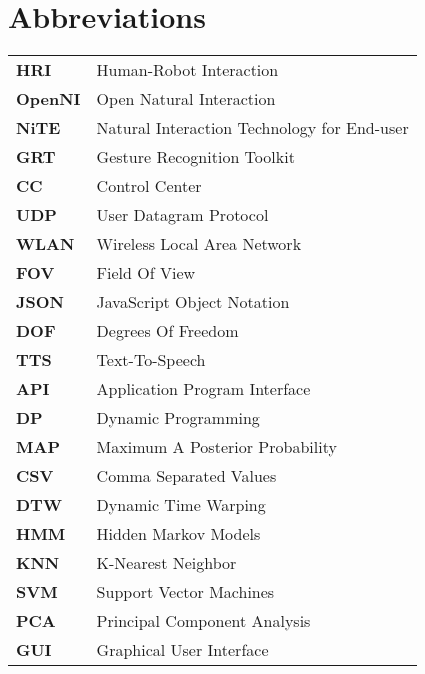  {} 
\chapter*{Abbreviations}
\begin{center}
	\begin{tabular}
		{ll}

		\textbf{HRI} & Human-Robot Interaction\\		
		\textbf{OpenNI} & Open Natural Interaction\\
		\textbf{NiTE} & Natural Interaction Technology for End-user\\
		\textbf{GRT} & Gesture Recognition Toolkit\\
		\textbf{CC} & Control Center\\
		\textbf{UDP} & User Datagram Protocol\\
		\textbf{WLAN} & Wireless Local Area Network\\				
		\textbf{FOV} & Field Of View\\
		\textbf{JSON} & JavaScript Object Notation\\
		\textbf{DOF} & Degrees Of Freedom\\
		\textbf{TTS} & Text-To-Speech\\
		\textbf{API} & Application Program Interface\\		
		\textbf{DP} & Dynamic Programming\\		
		\textbf{MAP} & Maximum A Posterior Probability\\
		\textbf{CSV} & Comma Separated Values\\
		\textbf{DTW} & Dynamic Time Warping\\
		\textbf{HMM} & Hidden Markov Models\\
		\textbf{KNN} & K-Nearest Neighbor\\
		\textbf{SVM} & Support Vector Machines\\
		\textbf{PCA} & Principal Component Analysis\\
		\textbf{GUI} & Graphical User Interface\\
		
	\end{tabular}
\end{center}


